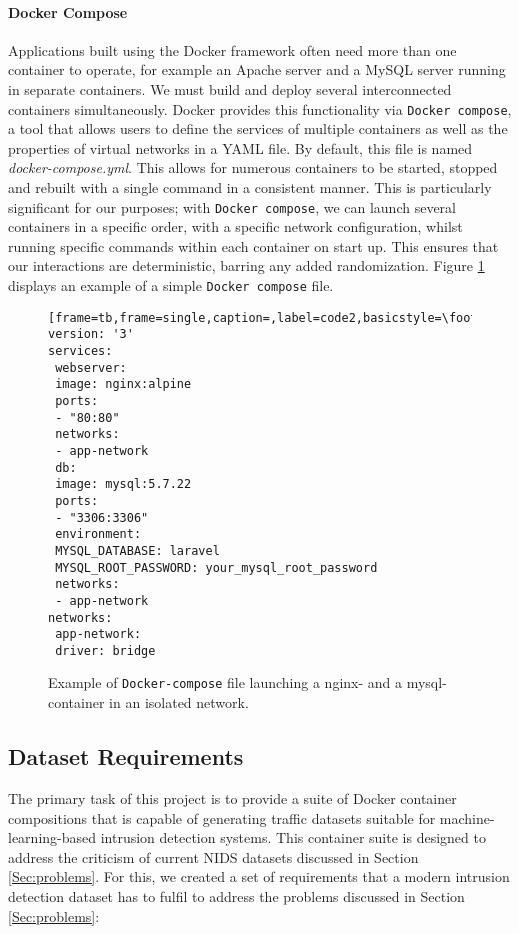 \documentclass[sigconf]{acmart}
\begin{document}
\paragraph*{Docker Compose}
Applications built using the Docker framework often need more than one container to operate, for example an Apache server and a MySQL server running in separate containers. We must build and deploy several interconnected containers simultaneously. Docker provides this functionality via \texttt{Docker compose}, a tool that allows users to define the services of multiple containers as well as the properties of virtual networks in a YAML file. By default, this file is named \textit{docker-compose.yml}. This allows for numerous containers to be started, stopped and rebuilt with a single command in a consistent manner. This is particularly significant for our purposes; with \texttt{Docker compose}, we can launch several containers in a specific order, with a specific network configuration, whilst running specific commands within each container on start up. This ensures that our interactions are deterministic, barring any added randomization. Figure \ref{fig:dockercompose} displays an example of a simple \texttt{Docker compose} file.

\begin{figure}
\begin{lstlisting}[frame=tb,frame=single,caption=,label=code2,basicstyle=\footnotesize]
version: '3'
services:
 webserver:
 image: nginx:alpine
 ports:
 - "80:80"
 networks:
 - app-network
 db:
 image: mysql:5.7.22
 ports:
 - "3306:3306"
 environment:
 MYSQL_DATABASE: laravel
 MYSQL_ROOT_PASSWORD: your_mysql_root_password
 networks:
 - app-network
networks:
 app-network:
 driver: bridge
\end{lstlisting}
\caption{Example of \texttt{Docker-compose} file launching a nginx- and a mysql-container in an isolated network.}
\label{fig:dockercompose}
\end{figure}{}


\subsection{Dataset Requirements}\label{Sec:require}


The primary task of this project is to provide a suite of Docker container compositions that is capable of generating traffic datasets suitable for machine-learning-based intrusion detection systems. This container suite is designed to address the criticism of current NIDS datasets discussed in Section \ref{Sec:problems}. For this, we created a set of requirements that a modern intrusion detection dataset has to fulfil to address the problems discussed in Section \ref{Sec:problems}:
\end{document}
